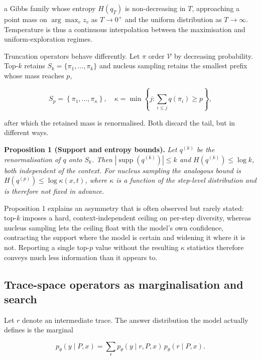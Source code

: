 \documentclass[conference]{IEEEtran}
\begin{document}
a Gibbs family whose entropy $H(q_{T})$ is non-decreasing in $T$,
approaching a point mass on $\arg\max_{v} z_{v}$ as $T \to 0^{+}$ and
the uniform distribution as $T \to \infty$.  Temperature is thus a
continuous interpolation between the maximisation and
uniform-exploration regimes.

Truncation operators behave differently.  Let $\pi$ order $\mathcal{V}$
by decreasing probability.  Top-$k$ retains $S_{k} = \{\pi_{1}, \ldots,
\pi_{k}\}$ and nucleus sampling retains the smallest prefix whose
mass reaches $p$,

\begin{equation}
S_{p} = \left\{\pi_{1}, \dots, \pi_{\kappa}\right\}, \quad \kappa = \min\left\{j: \sum_{i \leq j} q(\pi_{i}) \geq p\right\},
\label{eq:nucleus}
\end{equation}

after which the retained mass is renormalised.  Both discard the
tail, but in different ways.

\textbf{Proposition 1 (Support and entropy bounds).} \textit{Let $q^{(k)}$ be the renormalisation of $q$ onto $S_k$. Then $|\operatorname{supp}(q^{(k)})| \leq k$ and $H(q^{(k)}) \leq \log k$, both independent of the context. For nucleus sampling the analogous bound is $H(q^{(p)}) \leq \log \kappa(x, t)$, where $\kappa$ is a function of the step-level distribution and is therefore not fixed in advance.}

Proposition 1 explains an asymmetry that is often observed but rarely
stated: top-$k$ imposes a hard, context-independent ceiling on
per-step diversity, whereas nucleus sampling lets the ceiling float
with the model's own confidence, contracting the support where the
model is certain and widening it where it is not.  Reporting a single
top-$p$ value without the resulting $\kappa$ statistics therefore
conveys much less information than it appears to.

\subsection{Trace-space operators as marginalisation and search}
\label{sec:trace-operators}

Let $r$ denote an intermediate trace.  The answer distribution the model actually defines is the marginal

\begin{equation}
p_{\theta}(y \mid P, x) = \sum_{r} p_{\theta}(y \mid r, P, x) \, p_{\theta}(r \mid P, x).
\label{eq:marginal}
\end{equation}
\end{document}
